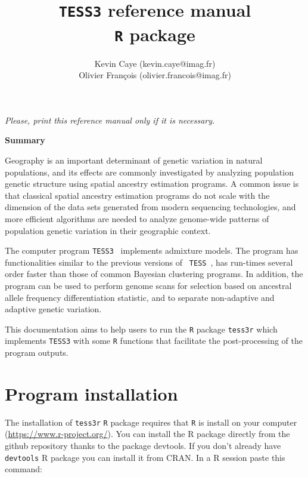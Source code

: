 \documentclass[10pt,a4paper]{article}
\title{{\tt TESS3} reference manual \\
{\tt R} package
}
\author{
        Kevin Caye (kevin.caye@imag.fr)\\
        Olivier Fran\c cois (olivier.francois@imag.fr)\\
}
\begin{document}
\maketitle
\begin{center}
{\it Please, print this reference manual only if it is necessary.}
\end{center}

\vspace{.5cm}

\begin{center} {\bf Summary}
\end{center}


\vspace{.5cm}

Geography is an important determinant of genetic variation in natural 
populations, and its effects are commonly investigated by analyzing population 
genetic structure using spatial ancestry estimation programs. A common issue is 
that classical spatial ancestry estimation programs do not scale with the 
dimension of the data sets generated from modern sequencing technologies, and 
more efficient algorithms are needed to analyze genome-wide patterns of 
population genetic variation in their geographic context.

The computer program {\tt TESS3}~\cite{TESS3} implements admixture models. The program has 
functionalities similar to the previous versions of {\tt 
TESS}~\cite{chen2007bayesian,durand2009spatial}, has run-times several order 
faster than those of common Bayesian clustering programs. In addition, the 
program can be used to perform genome scans for selection based on ancestral 
allele frequency differentiation statistic, and to separate non-adaptive and 
adaptive genetic variation.

This documentation aims to help users to run the {\tt R} package {\tt tess3r} 
which implements {\tt TESS3} with some {\tt R} functions that facilitate the 
post-processing of the program outputs. 

\vspace{.5cm}


\section{Program installation} 

The installation of {\tt tess3r} {\tt R} package requires that {\tt R} is install on your computer (\url{https://www.r-project.org/}). You can install the R package directly from the github repository thanks to the package devtools. 
If you don't already have {\tt devtools} R package you can install it from CRAN. In a R session paste this command:
\end{document}
